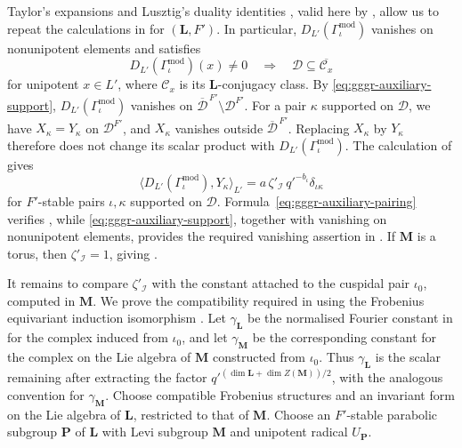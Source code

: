 \documentclass[10pt]{amsart}
\theoremstyle{definition}
\let\oldendproof\endproof
\renewenvironment{proof}[1][\proofname]{%
  \oldproof[\bfseries #1]%
}{\oldendproof}
\numberwithin{equation}{section}
\numberwithin{table}{section}
\begin{document}
\begin{proof}[Proof of Lemma~\ref{lem:type-b-isolated-coverage}]
Taylor's expansions \cite[Theorem~11.13 and Lemma~11.16]{Taylor2016}
and Lusztig's duality identities
\cite[Proposition~8.5 and Corollary~8.6]{Lusztig1992Support}, valid here
by \cite[Corollary~13.6]{Taylor2016}, allow us to repeat the calculations in
\cite[Lemma~3.5 and Corollary~3.6(b)]{Geck1994BasicIII} for
$(\mathbf L,F')$. In particular, $D_{L'}(\Gamma_\iota^{\mathrm{mod}})$
vanishes on nonunipotent elements and satisfies
\begin{equation}\label{eq:gggr-auxiliary-support}
 D_{L'}(\Gamma_\iota^{\mathrm{mod}})(x)\ne0
 \quad\Longrightarrow\quad
 \mathcal D\subseteq\overline{\mathcal C_x}
\end{equation}
for unipotent $x\in L'$, where $\mathcal C_x$ is its
$\mathbf L$-conjugacy class. By \eqref{eq:gggr-auxiliary-support},
$D_{L'}(\Gamma_\iota^{\mathrm{mod}})$ vanishes on
$\overline{\mathcal D}^{\,F'}\setminus\mathcal D^{F'}$.
For a pair $\kappa$ supported on $\mathcal D$, we have
$X_\kappa=Y_\kappa$ on $\mathcal D^{F'}$, and $X_\kappa$ vanishes
outside $\overline{\mathcal D}^{\,F'}$. Replacing $X_\kappa$ by
$Y_\kappa$ therefore does not change its scalar product with
$D_{L'}(\Gamma_\iota^{\mathrm{mod}})$.
The calculation of \cite[Lemma~3.5]{Geck1994BasicIII} gives
\begin{equation}\label{eq:gggr-auxiliary-pairing}
 \bigl\langle D_{L'}(\Gamma_\iota^{\mathrm{mod}}),Y_\kappa\bigr\rangle_{L'}
 =a\,\zeta'_{\mathcal I}\,q'^{-b_\iota}\delta_{\iota\kappa}
\end{equation}
for $F'$-stable pairs $\iota,\kappa$ supported on $\mathcal D$.
Formula~\eqref{eq:gggr-auxiliary-pairing} verifies
\cite[(2.4)(a)]{Geck1999GGGR}, while
\eqref{eq:gggr-auxiliary-support}, together with vanishing on
nonunipotent elements, provides the required vanishing assertion in
\cite[(2.4)(c)]{Geck1999GGGR}. If $\mathbf M$ is a torus, then
$\zeta'_{\mathcal I}=1$, giving \cite[(2.4)(b)]{Geck1999GGGR}.

It remains to compare $\zeta'_{\mathcal I}$ with the constant attached
to the cuspidal pair $\iota_0$, computed in $\mathbf M$.
We prove the compatibility required in \cite[(3.3)(b)]{Geck1999GGGR}
using the Frobenius equivariant induction isomorphism
\cite[(6.2.11)]{Letellier2005}.
Let $\gamma_{\mathbf L}$ be the normalised Fourier constant in
\cite[Lemma~11.3]{Taylor2016} for the complex induced from $\iota_0$,
and let $\gamma_{\mathbf M}$ be the corresponding constant for the
complex on the Lie algebra of $\mathbf M$ constructed from $\iota_0$.
Thus $\gamma_{\mathbf L}$ is the scalar remaining after extracting
the factor $q'^{(\dim\mathbf L+\dim Z(\mathbf M))/2}$, with the
analogous convention for $\gamma_{\mathbf M}$.
Choose compatible Frobenius structures and an invariant form on the Lie
algebra of $\mathbf L$, restricted to that of $\mathbf M$.
Choose an $F'$-stable parabolic subgroup $\mathbf P$ of $\mathbf L$
with Levi subgroup $\mathbf M$ and unipotent radical $U_{\mathbf P}$.


\end{proof}
\end{document}

